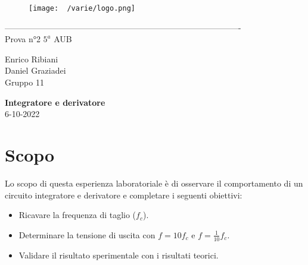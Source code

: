\documentclass[12pt]{article}
\begin{document}
    \begin{titlepage}
    \begin{center}
\begin{figure}
    \centering
    \texttt{[image: ~/varie/logo.png]}
    \label{fig:logo}
\end{figure}
-------------------------------------------------------------------------------------\\
\vspace{2\baselineskip}
\large Prova n°2
\hfill
\large $5^a$   AUB\\
\begin{flushleft}
    \large Enrico Ribiani\\
    \large Daniel Graziadei\\
    \large Gruppo 11\\
\end{flushleft}


\vfill

\Huge{\textbf{Integratore e derivatore}}\\
\vfill
\vfill
\large{6-10-2022}
\end{center}
\end{titlepage}
\tableofcontents
\newpage
\vskip 1cm
\section{Scopo}
Lo scopo di questa esperienza laboratoriale è di osservare il comportamento di un circuito integratore 
e derivatore e completare i seguenti obiettivi:\\
\noindent
\begin{itemize}
    \item Ricavare la frequenza di taglio ($f_c$).
    \item Determinare la tensione di uscita con $f=10f_c$ e $f=\frac{1}{10}f_c$.
    \item Validare il risultato sperimentale con i risultati teorici.
\end{itemize}
\end{document}
